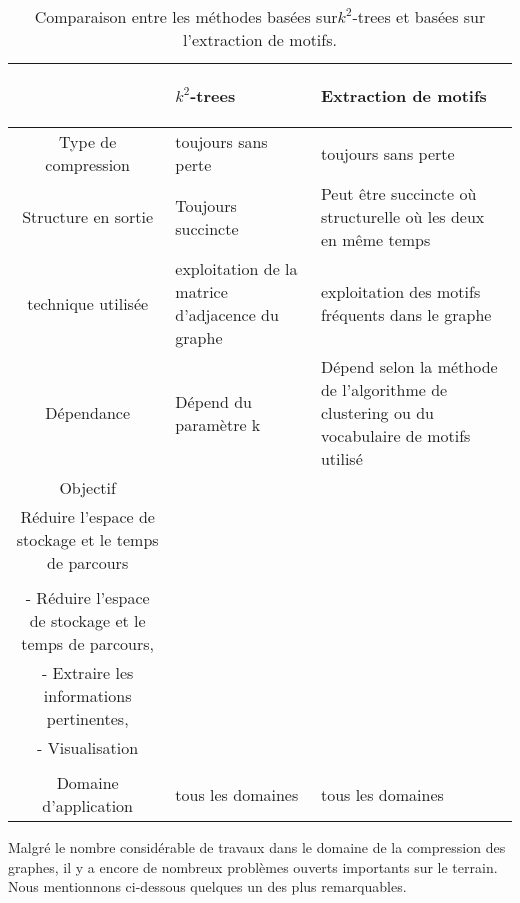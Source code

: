 \begin{table}[H]
\begin{tabular}{|c|p{6cm}|p{4cm}|}

\hline & \begin{center}
\textbf{$k^2$-trees}
\end{center}     &  \begin{center} \textbf{Extraction de motifs} \end{center}  \\
										
										
\hline Type de compression & toujours sans perte & toujours sans perte \\
\hline Structure en sortie & Toujours succincte & Peut être succincte où structurelle où les deux en même temps\\

\hline technique utilisée & exploitation de la matrice d'adjacence du graphe & exploitation des motifs fréquents dans le graphe\\

\hline Dépendance & Dépend du paramètre k & Dépend selon la méthode de l'algorithme de clustering ou du vocabulaire de motifs utilisé  \\

\hline Objectif & 
\begin{minipage}[t]{0.35\textwidth}
  			Compression,\\
  			Réduire l'espace de stockage et le temps de parcours\\
  \end{minipage}
  &
  \begin{minipage}[t]{0.25\textwidth}
  			- Compression,\\
  			- Réduire l'espace de  stockage et le temps de parcours,\\
  			- Extraire les informations pertinentes, \\
  			- Visualisation \\
  \end{minipage}
  \\
  \hline Domaine d'application & tous les domaines & tous les domaines \\
  \hline
\end{tabular}
									\caption{Comparaison entre les méthodes basées sur$k^2$-trees et basées sur l'extraction de motifs.}									\label{comgen}
									
								\end{table}
								
								Malgré le nombre considérable de travaux dans
le domaine de la compression des graphes, il y a encore
de nombreux problèmes ouverts importants sur le terrain. Nous mentionnons ci-dessous quelques un des plus remarquables.
 


